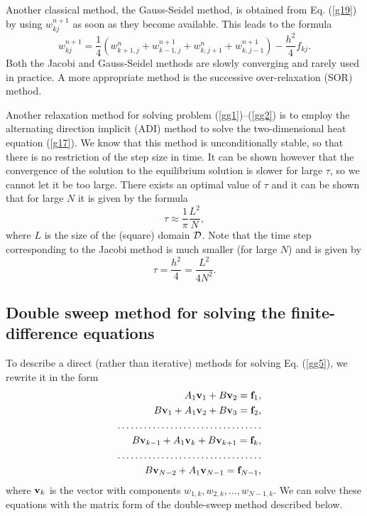 Another classical method, the Gauss-Seidel method, is obtained from Eq. (\ref{g19})
by using $w_{kj}^{n+1}$ as soon as they become available. This leads to the formula
\begin{equation}
w_{kj}^{n+1}=\frac{1}{4}\left(w^{n}_{k+1,j}+w^{n+1}_{k-1,j}+w^{n}_{k,j+1}+w^{n+1}_{k,j-1}\right)
-\frac{h^2}{4}f_{kj}. \label{g20}
\end{equation}
Both the Jacobi and Gauss-Seidel methods are slowly converging and rarely used in practice.
A more appropriate method is the successive over-relaxation (SOR) method.

Another relaxation method for solving problem (\ref{gg1})--(\ref{gg2}) is to employ the alternating direction
implicit (ADI) method to solve the two-dimensional heat equation (\ref{g17}).
We know that this method is unconditionally stable, so that
there is no restriction of the step size in time. It can be shown however that the convergence of the
solution to the equilibrium solution is slower for large $\tau$, so we cannot let it be too large.
There exists an optimal value of $\tau$ and it can be shown that for large $N$ it is given by the formula
\[
\tau\approx\frac{1}{\pi}\frac{L^2}{N},
\]
where $L$ is the size of the (square) domain ${\cal D}$. Note that the time step corresponding
to the Jacobi method is much smaller (for large $N$) and is given by
\[
\tau=\frac{h^2}{4}=\frac{L^2}{4N^2}.
\]


\subsection{Double sweep method for solving the finite-difference equations}
To describe a direct (rather than iterative) methods for solving Eq. (\ref{gg5}), we rewrite
it in the form
\begin{eqnarray}
&&A_{1}{\bf v}_{1}+B{\bf v}_{2}={\bf f}_{1}, \nonumber \\
&&B{\bf v}_{1}+A_{1}{\bf v}_{2}+B{\bf v}_{3}={\bf f}_{2}, \nonumber \\
&& \dots \dots \dots \dots \dots \dots \dots \dots \dots \dots \dots \nonumber \\
&&B{\bf v}_{k-1}+A_{1}{\bf v}_{k}+B{\bf v}_{k+1}={\bf f}_{k}, \nonumber \\
&& \dots \dots \dots \dots \dots \dots \dots \dots \dots \dots \dots \nonumber \\
&&B{\bf v}_{N-2}+A_{1}{\bf v}_{N-1}={\bf f}_{{N-1}}, \label{g21}
\end{eqnarray}
where ${\bf v}_{k}$ is the vector with components $w_{1,k},
w_{2,k}, \dots, w_{N-1,k}$.
We can solve these equations with
the matrix form of the double-sweep method described below.


